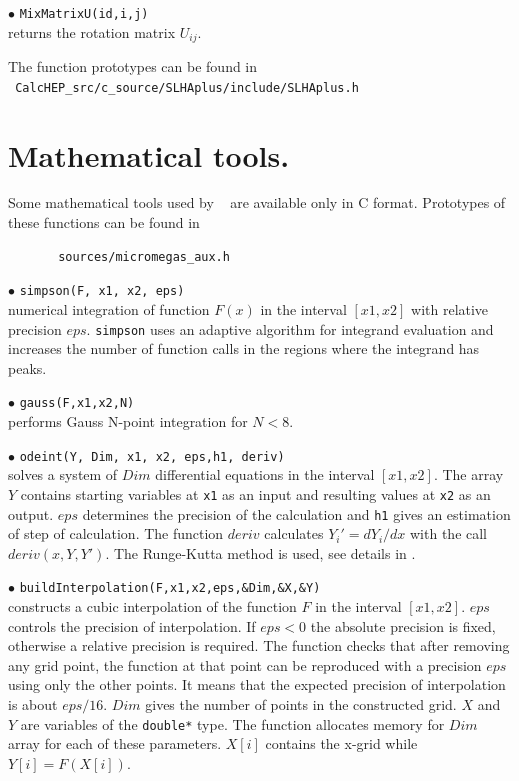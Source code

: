 \documentclass[12pt,a4paper]{article}
\begin{document}
\noindent
$\bullet$ \verb|MixMatrixU(id,i,j)|\\
returns the rotation matrix $U_{ij}$.

The function prototypes can be found in \\
\noindent
\verb| CalcHEP_src/c_source/SLHAplus/include/SLHAplus.h|

\section {Mathematical tools.}

Some mathematical tools used by \micro~ are available only 
in C format. Prototypes of these functions can be found in
\begin{verbatim}
       sources/micromegas_aux.h 
\end{verbatim}

\noindent$\bullet$ \verb|simpson(F, x1, x2, eps)|\\
numerical integration of function $F(x)$ in the interval $[x1,x2]$  
with relative precision $eps$. \verb|simpson| uses an adaptive algorithm 
for integrand evaluation and increases the number of function calls in 
the regions where the  integrand has peaks. 

\noindent$\bullet$ \verb|gauss(F,x1,x2,N)|\\
performs Gauss N-point integration for $N<8$.  

\noindent$\bullet$ \verb|odeint(Y, Dim, x1, x2, eps,h1, deriv)|\\
solves a  system of $Dim$ differential  equations in the interval 
$[x1,x2]$. The array $Y$ contains starting variables at \verb|x1| as an input and 
resulting values at \verb|x2| as an output. $eps$ determines the precision of the 
calculation and  \verb|h1| gives an estimation of step of calculation.  
The function $deriv$ calculates 
$Y_i' = dY_i/dx$ with the call $deriv(x,Y,Y')$. The Runge-Kutta method is
used, see details in \cite{Numerical}.  

\noindent$\bullet$ \verb|buildInterpolation(F,x1,x2,eps,&Dim,&X,&Y)|\\
constructs  a cubic interpolation of the function $F$ in the interval $[x1,x2]$.
$eps$ controls the precision of interpolation. If $eps < 0$ the absolute 
precision is fixed, otherwise a relative precision is required. 
The function checks that after removing any grid point, the function at that point
can be reproduced with a precision $eps$ using only the other points.  It means that
the expected precision of interpolation is about $eps/16$. $Dim$ gives the number 
of points in the  constructed grid. $X$ and $Y$ are variables of the  
\verb|double*| type. The function allocates memory for $Dim$ array for each 
 of these parameters. $X[i]$ contains the x-grid while $Y[i]=F(X[i])$.
\end{document}
